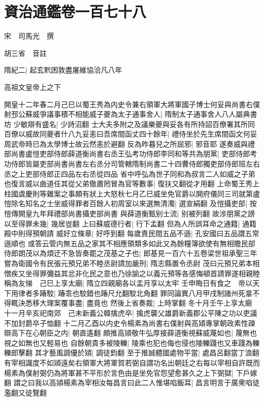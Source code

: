 \chapter{資治通鑑卷一百七十八}
宋　司馬光　撰

胡三省　音註

隋紀二|{
	起玄黓困敦盡屠維協洽凡八年}


高祖文皇帝上之下

開皇十二年春二月己巳以蜀王秀為内史令兼右領軍大將軍國子博士何妥與尚書右僕射邳公蘇威爭議事積不相能威子夔為太子通事舍人|{
	隋制太子通事舍人八人屬典書坊}
少敏辯有盛名|{
	少詩沼翻}
士大夫多附之及議樂夔與妥各有所持詔百僚署其所同百僚以威故同夔者什八九妥恚曰吾席間函丈四十餘年|{
	禮侍坐於先生席間函文何妥周武帝時已為太學博士故云然恚於避翻}
反為昨暮兒之所屈邪|{
	邪音耶}
遂奏威與禮部尚書盧愷吏部侍郎薛道衡尚書右丞王弘考功侍郎李同和等共為朋黨|{
	吏部侍郎考功侍郎皆屬吏部尚書尚書左右丞分司管轄隋制尚書二十四曹侍郎獨吏部侍郎班左右丞之上吏部侍郎正四品左右丞從四品}
省中呼弘為世子同和為叔言二人如威之子弟也復言威以曲道任其從父弟徹肅罔冒為官等數事|{
	復扶又翻從才用翻}
上命蜀王秀上柱國虞慶則等雜案之事頗有狀上大怒秋七月乙巳威坐免官爵以開府儀同三司就第盧愷除名知名之士坐威得罪者百餘人初周室以來選無清濁|{
	選宣絹翻}
及愷攝吏部|{
	按愷傳開皇九年拜禮部尚書攝吏部尚書}
與薛道衡甄别士流|{
	别被列翻}
故涉朋黨之謗以至得罪未幾|{
	幾居豈翻}
上曰蘇威德行者|{
	行下孟翻}
但為人所誤耳命之通籍|{
	通籍殿中則得預朝請}
威好立條章|{
	好呼到翻}
每歲責民間五品不遜|{
	孔安國曰五品謂五常遜順也}
或答云管内無五品之家其不相應領類多如此又為餘糧簿欲使有無相贍民部侍郎朗茂以為煩迂不急皆奏罷之茂基之子也|{
	郎基見一百六十五卷梁世祖承聖三年}
嘗為衛國令有民張元預兄弟不睦丞尉請加嚴刑|{
	隋志縣置令丞尉}
茂曰元預兄弟本相憎疾又坐得罪彌益其忿非化民之意也乃徐諭之以義元預等各感悔頓首請罪遂相親睦稱為友悌　己巳上享太廟|{
	隋立四親廟各以孟月享以太牢}
壬申晦日有食之　帝以天下用律者多踳駮|{
	踳乖也駮錯也踳尺允翻駮北角翻}
罪同論異八月甲戌制諸州死辠不得輒決悉移大理案覆事盡|{
	盡竟也}
然後上省奏裁|{
	上時掌翻}
冬十月壬午上享太廟　十一月辛亥祀南郊　己未新義公韓擒虎卒|{
	擒虎襲父雄爵新義郡公平陳之功以吏議不加封爵卒子恤翻}
十二月乙酉以内史令楊素為尚書右僕射與高熲專掌朝政素性疎辯高下在心朝臣之内|{
	朝直遙翻}
頗推高熲敬牛弘厚接薛道衡視蘇威蔑如也|{
	蔑無也視之如無也又輕易也}
自餘朝貴多被陵轢|{
	陵乘也犯也侮也侵也陵轢踐也又車踐為轢轢郎擊翻}
其才藝風調優於熲|{
	調徒鈞翻}
至于推誠體國處物平當|{
	處昌呂翻當丁浪翻}
有宰相識度不如熲遠矣右領軍大將軍賀若弼自謂功名出朝廷之右每以宰相自許既而楊素為僕射弼仍為將軍甚不平形於言色由是坐免官怨望愈甚久之上下弼獄|{
	下戶嫁翻}
謂之曰我以高熲楊素為宰相汝每昌言曰此二人惟堪啗飯耳|{
	昌言明言于廣衆啗徒濫翻又徒覽翻}
